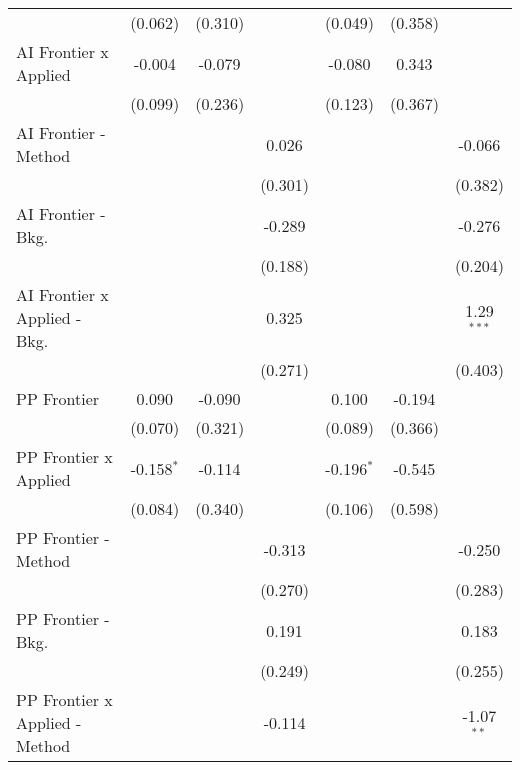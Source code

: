 \begin{tabular}{lcccccc}
                                  & (0.062)      & (0.310) &         & (0.049)       & (0.358) &   \\   
   AI Frontier x Applied          & -0.004       & -0.079  &         & -0.080        & 0.343   &   \\   
                                  & (0.099)      & (0.236) &         & (0.123)       & (0.367) &   \\   
   AI Frontier - Method           &              &         & 0.026   &               &         & -0.066\\   
                                  &              &         & (0.301) &               &         & (0.382)\\   
   AI Frontier - Bkg.             &              &         & -0.289  &               &         & -0.276\\   
                                  &              &         & (0.188) &               &         & (0.204)\\   
   AI Frontier x Applied - Bkg.   &              &         & 0.325   &               &         & 1.29$^{***}$\\   
                                  &              &         & (0.271) &               &         & (0.403)\\   
   PP Frontier                    & 0.090        & -0.090  &         & 0.100         & -0.194  &   \\   
                                  & (0.070)      & (0.321) &         & (0.089)       & (0.366) &   \\   
   PP Frontier x Applied          & -0.158$^{*}$ & -0.114  &         & -0.196$^{*}$  & -0.545  &   \\   
                                  & (0.084)      & (0.340) &         & (0.106)       & (0.598) &   \\   
   PP Frontier - Method           &              &         & -0.313  &               &         & -0.250\\   
                                  &              &         & (0.270) &               &         & (0.283)\\   
   PP Frontier - Bkg.             &              &         & 0.191   &               &         & 0.183\\   
                                  &              &         & (0.249) &               &         & (0.255)\\   
   PP Frontier x Applied - Method &              &         & -0.114  &               &         & -1.07$^{**}$\\   

\end{tabular}
